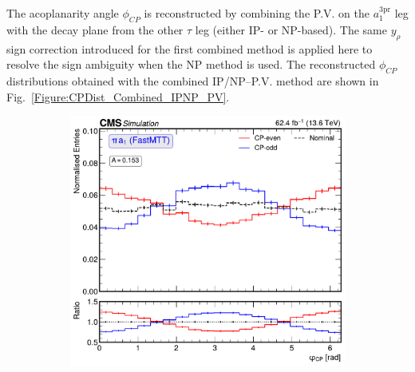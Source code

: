 The acoplanarity angle $\phi_{CP}$ is reconstructed by combining the \ac{P.V.} on the $a_1^{3\text{pr}}$ leg with the decay plane from the other $\tau$ leg (either \ac{IP}- or \ac{NP}-based). The same $y_\rho$ sign correction introduced for the first combined method is applied here to resolve the sign ambiguity when the \ac{NP} method is used. The reconstructed $\phi_{CP}$ distributions obtained with the combined \ac{IP}/\ac{NP}--\ac{P.V.} method are shown in Fig.~\ref{Figure:CPDist_Combined_IPNP_PV}.

\begin{figure}[!htbp]
        \centering
        \begin{subfigure}[b]{0.49\textwidth}
            \centering
            \includegraphics[width=\textwidth]{Figures/Chapter7/Acoplanarity/With_IP/aco_pi_a1_FASTMTT_MassConstraint.pdf}
            \caption{}
        \end{subfigure}
        \begin{subfigure}[b]{0.49\textwidth}
            \centering

\end{subfigure}
\end{figure}
